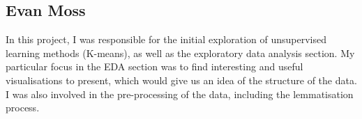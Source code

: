 \documentclass{article}
\begin{document}
\subsection{Evan Moss}
In this project, I was responsible for the initial exploration of unsupervised learning methods (K-means), as well as the exploratory data analysis section. My particular focus in the EDA section was to find interesting and useful visualisations to present, which would give us an idea of the structure of the data. I was also involved in the pre-processing of the data, including the lemmatisation process.



\end{document}
